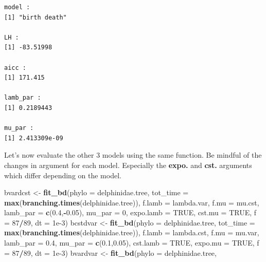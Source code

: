 \documentclass[
]{book}
\newenvironment{Shaded}{\begin{snugshade}}{\end{snugshade}}
\newcommand{\DataTypeTok}[1]{\textcolor[rgb]{0.13,0.29,0.53}{#1}}
\newcommand{\DecValTok}[1]{\textcolor[rgb]{0.00,0.00,0.81}{#1}}
\newcommand{\FloatTok}[1]{\textcolor[rgb]{0.00,0.00,0.81}{#1}}
\newcommand{\KeywordTok}[1]{\textcolor[rgb]{0.13,0.29,0.53}{\textbf{#1}}}
\newcommand{\NormalTok}[1]{#1}
\newcommand{\OperatorTok}[1]{\textcolor[rgb]{0.81,0.36,0.00}{\textbf{#1}}}
\newcommand{\OtherTok}[1]{\textcolor[rgb]{0.56,0.35,0.01}{#1}}
\newcommand{\StringTok}[1]{\textcolor[rgb]{0.31,0.60,0.02}{#1}}
\begin{document}
\begin{verbatim}
model :
[1] "birth death"

LH :
[1] -83.51998

aicc :
[1] 171.415

lamb_par :
[1] 0.2189443

mu_par :
[1] 2.413309e-09
\end{verbatim}

Let's now evaluate the other 3 models using the same function. Be mindful of the changes in argument for each model. Especially the \textbf{expo.} and \textbf{cst.} arguments which differ depending on the model.

\begin{Shaded}
\begin{Highlighting}[]
\NormalTok{bvardcst \textless{}{-}}\StringTok{ }\KeywordTok{fit\_bd}\NormalTok{(}\DataTypeTok{phylo =}\NormalTok{ delphinidae.tree, }
                   \DataTypeTok{tot\_time =} \KeywordTok{max}\NormalTok{(}\KeywordTok{branching.times}\NormalTok{(delphinidae.tree)),}
                   \DataTypeTok{f.lamb =}\NormalTok{ lambda.var, }\DataTypeTok{f.mu =}\NormalTok{ mu.cst,}
                   \DataTypeTok{lamb\_par =} \KeywordTok{c}\NormalTok{(}\FloatTok{0.4}\NormalTok{,}\OperatorTok{{-}}\FloatTok{0.05}\NormalTok{), }\DataTypeTok{mu\_par =} \DecValTok{0}\NormalTok{,}
                   \DataTypeTok{expo.lamb =} \OtherTok{TRUE}\NormalTok{, }\DataTypeTok{cst.mu =} \OtherTok{TRUE}\NormalTok{,}
                   \DataTypeTok{f =} \DecValTok{87}\OperatorTok{/}\DecValTok{89}\NormalTok{, }\DataTypeTok{dt =} \FloatTok{1e{-}3}\NormalTok{)}
\NormalTok{bcstdvar \textless{}{-}}\StringTok{ }\KeywordTok{fit\_bd}\NormalTok{(}\DataTypeTok{phylo =}\NormalTok{ delphinidae.tree, }
                   \DataTypeTok{tot\_time =} \KeywordTok{max}\NormalTok{(}\KeywordTok{branching.times}\NormalTok{(delphinidae.tree)),}
                   \DataTypeTok{f.lamb =}\NormalTok{ lambda.cst, }\DataTypeTok{f.mu =}\NormalTok{ mu.var,}
                   \DataTypeTok{lamb\_par =} \FloatTok{0.4}\NormalTok{, }\DataTypeTok{mu\_par =} \KeywordTok{c}\NormalTok{(}\FloatTok{0.1}\NormalTok{,}\FloatTok{0.05}\NormalTok{),}
                   \DataTypeTok{cst.lamb =} \OtherTok{TRUE}\NormalTok{, }\DataTypeTok{expo.mu =} \OtherTok{TRUE}\NormalTok{,}
                   \DataTypeTok{f =} \DecValTok{87}\OperatorTok{/}\DecValTok{89}\NormalTok{, }\DataTypeTok{dt =} \FloatTok{1e{-}3}\NormalTok{)}
\NormalTok{bvardvar \textless{}{-}}\StringTok{ }\KeywordTok{fit\_bd}\NormalTok{(}\DataTypeTok{phylo =}\NormalTok{ delphinidae.tree, }

\end{Highlighting}
\end{Shaded}
\end{document}
